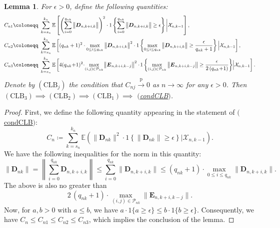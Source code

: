 \documentclass[11pt]{article}
\renewcommand\vec[1]{\boldsymbol{#1}}
\newcommand{\E}{\mathbb{E}}
\newcommand{\X}{\mathcal{X}}
\newcommand{\PP}{\mathcal{P}}
\newcommand{\refitem}[1]{$\mathrm{(}$\hyperlink{cond:#1}{\csname cond#1\endcsname}$\mathrm{)}$}
\newcommand{\pconverge}{\overset{\mathrm{p}}{\to}}
\newtheorem{lemma}{Lemma}
\theoremstyle{definition}
\begin{document}
\begin{lemma}\label{lemma:clb-sufficient}
For $\epsilon > 0$, define the following quantities:
\begin{align*}
    C_{n1} \coloneqq &\ \sum_{k=s_n}^{k_n} \E\left[ \left(\sum_{i=0}^{q_{nk}} \big\| \vec{D}_{n,k+i,k} \big\|\right)^2 \cdot 1\left\{\sum_{i=0}^{q_{nk}} \big\| \vec{D}_{n,k+i,k} \big\| \geq \epsilon\right\} \bigg| \X_{n,k-1}\right], \\
    C_{n2} \coloneqq &\ \sum_{k=s_n}^{k_n} \E\left[(q_{nk} + 1)^2 \cdot \max_{0 \leq i \leq q_{nk}} \big\| \vec{D}_{n,k+i,k} \big\|^2 \cdot 1\left\{\max_{0 \leq i \leq q_{nk}} \big\| \vec{D}_{n,k+i,k} \big\| \geq \frac{\epsilon}{q_{nk} + 1}\right\} \Big| \X_{n,k-1}\right], \\
    C_{n3} \coloneqq &\ \sum_{k=s_n}^{k_n} \E\left[4 (q_{nk} \hspace{-2pt} + \hspace{-2pt} 1)^2 \hspace{-2pt} \cdot \hspace{-2pt} \max_{(i,j) \in \PP_{nk}} \hspace{-1pt} \big\| \vec{E}_{n,k+i,k-j}\big\|^2 \hspace{0pt} \cdot \hspace{-1pt} 1\left\{\max_{(i,j) \in \PP_{nk}} \big\|  \vec{E}_{n,k+i,k-j} \big\| \geq \frac{\epsilon}{2\, (q_{nk} \hspace{-2pt} + \hspace{-2pt} 1)}\right\} \hspace{-2pt} \Big| \X_{n,k-1}\right].
\end{align*}
Denote by $(\mathrm{CLB}_j)$ the condition that $C_{nj} \pconverge 0$ as $n \to \infty$ for any $\epsilon > 0$. Then $(\mathrm{CLB}_3) \implies (\mathrm{CLB}_2) \implies (\mathrm{CLB}_1) \implies$ \refitem{CLB}.
\end{lemma}

\begin{proof}
First, we define the following quantity appearing in the statement of \refitem{CLB}:
\[
    C_{n} \coloneqq \sum_{k=s_n}^{k_n} \E\left(\big\|\vec{D}_{nk}\big\|^2 \cdot 1\left\{\big\|\vec{D}_{nk}\big\| \geq \epsilon\right\} \Big| \X_{n,k-1}\right).
\]
We have the following inequalities for the norm in this quantity: 
\begin{equation*}
    \|\vec{D}_{nk}\| = \left\| \sum_{i=0}^{q_{nk}} \vec{D}_{n,k+i,k} \right\| \leq \sum_{i=0}^{q_{nk}} \big\| \vec{D}_{n,k+i,k} \big\| \leq (q_{nk} + 1) \cdot \max_{0 \leq i \leq q_{nk}} \big\| \vec{D}_{n,k+i,k} \big\|.
\end{equation*}
The above is also no greater than
\[
2\, (q_{nk} + 1) \cdot \max_{(i,j) \in \PP_{nk}} \big\|  \vec{E}_{n,k+i,k-j} \big\|.
\]
Now, for $a,b > 0$ with $a \leq b$, we have $a \cdot 1\{a \geq \epsilon\} \leq b \cdot 1\{b \geq \epsilon\}$.
Consequently, we have $C_n \leq C_{n1} \leq C_{n2} \leq C_{n3}$, which implies the conclusion of the lemma.

\end{proof}
\end{document}
